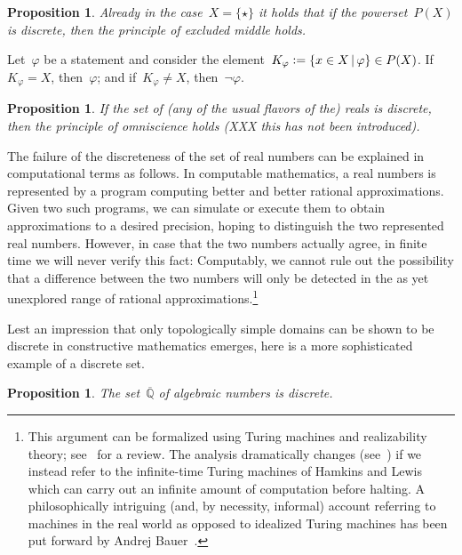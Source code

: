 \documentclass[10pt,reqno,a4paper,openany]{amsbook}
\makeatletter
\theoremstyle{definition}
\theoremstyle{plain}
\newtheorem{prop}[defn]{Proposition}
\theoremstyle{remark}
\newcommand{\QQ}{\mathbb{Q}}
\newcommand{\?}{\,{:}\,}
\renewcommand{\_}{\mathpunct{.}\,}
\newcommand{\defeq}{\vcentcolon=}
\renewenvironment{proof}[1][\proofname]{\par
  \pushQED{\qed}%
  \normalfont \topsep6\p@\@plus6\p@\relax
  \trivlist
  \item[\hskip\labelsep
        \itshape
    #1\@addpunct{.}]\ignorespaces
}{%
  \popQED\endtrivlist\@endpefalse
}
\makeatother
\begin{document}
\begin{prop}Already in the case~$X = \{\star\}$ it holds that if the
powerset~$P(X)$ is discrete, then the principle of excluded middle
holds.\end{prop}

\begin{proof}Let~$\varphi$ be a statement and consider the element~$K_\varphi
\defeq \{ x \in X \,|\, \varphi \} \in P(X)$. If~$K_\varphi = X$,
then~$\varphi$; and if~$K_\varphi \neq X$, then~$\neg\varphi$.\end{proof}

\begin{prop}If the set of (any of the usual flavors of the) reals is discrete,
then the principle of omniscience holds (XXX this has not been
introduced).\end{prop}

The failure of the discreteness of the set of real numbers can be explained in
computational terms as follows. In computable mathematics, a real numbers is
represented by a program computing better and better rational approximations.
Given two such programs, we can simulate or execute them to obtain
approximations to a desired precision, hoping to distinguish the two
represented real numbers. However, in case that the two numbers actually agree,
in finite time we will never verify this fact: Computably, we cannot rule out
the possibility that a difference between the two numbers will only be detected
in the as yet unexplored range of rational approximations.\footnote{This
argument can be formalized using Turing machines and realizability theory;
see~\cite[Section~4.2.1]{blechschmidt:filmat} for a review. The analysis
dramatically changes (see~\cite[Section~4.2.2]{blechschmidt:filmat}) if we
instead refer to the infinite-time Turing machines of Hamkins and
Lewis~\cite{hamkins-lewis:ittm} which can carry out an infinite amount of
computation before halting. A philosophically intriguing (and, by necessity,
informal) account referring to machines in the real world as opposed to
idealized Turing machines has been put forward by Andrej
Bauer~\cite{bauer:int-mathematics}.}

Lest an impression that only topologically simple domains can be shown to be
discrete in constructive mathematics emerges, here is a more sophisticated
example of a discrete set.

\begin{prop}The set~$\overline{\QQ}$ of algebraic numbers is
discrete.\end{prop}
\end{document}
